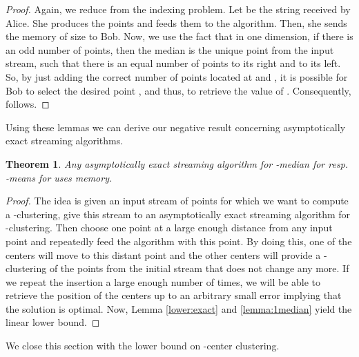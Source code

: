 \documentclass[a4paper,11pt,oneside,english,onecolumn]{article}
\newtheorem{theorem}{Theorem}
\theoremstyle{definition}
\begin{document}
\begin{proof}
Again, we reduce from the indexing problem. Let  be the string received by Alice. She produces the points 
and feeds them to the algorithm. Then, she sends the memory of size  to Bob. Now, we use the fact that in one dimension, if there is an odd number of points, then the median is the unique point from the input stream, such that there is an equal number of points to its right and to its left. So, by just adding the correct number of points located at  and , it is possible for Bob to select the desired point , and thus, to retrieve the value of . Consequently,  follows.
\end{proof}

Using these lemmas we can derive our negative result concerning asymptotically exact streaming algorithms.

\begin{theorem}
\label{lower:kmeanmed}
Any asymptotically exact streaming algorithm for -median for  resp. -means for  uses  memory.
\end{theorem}
\begin{proof}
The idea is given an input stream of points for which we want to compute a -clustering, give this stream to an asymptotically exact streaming algorithm for -clustering. Then choose one point at a large enough distance from any input point and repeatedly feed the algorithm with this point. By doing this, one of the centers will move to this distant point and the other  centers will provide a -clustering of the points from the initial stream that does not change any more. If we repeat the insertion a large enough number of times, we will be able to retrieve the position of the centers up to an arbitrary small error implying that the solution is optimal. Now, Lemma \ref{lower:exact} and \ref{lemma:1median} yield the linear lower bound.
\end{proof}

We close this section with the lower bound on -center clustering.
\end{document}
